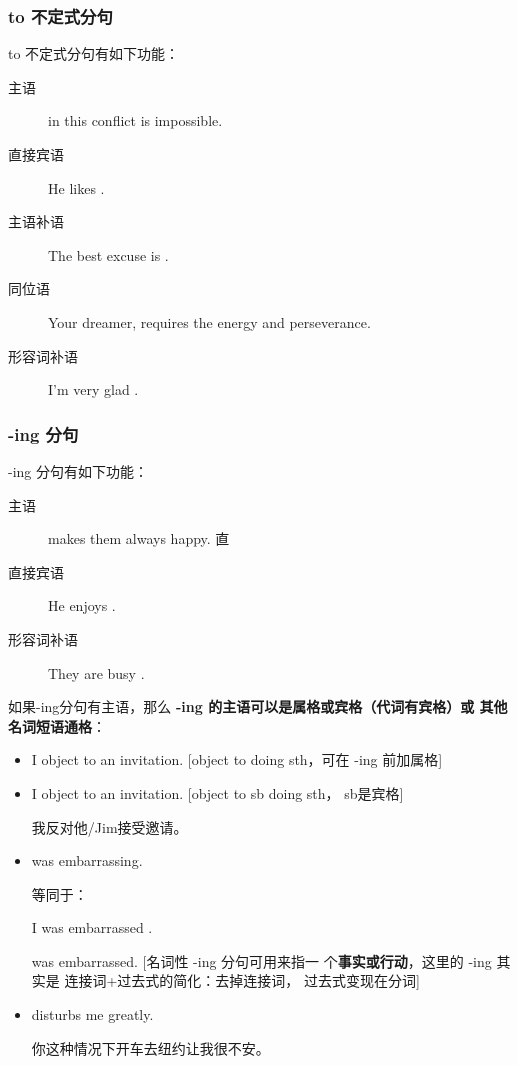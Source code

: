\subsubsection{to 不定式分句}

to 不定式分句有如下功能：
\begin{description}
\item[主语]  in this conflict is impossible.
\item[直接宾语] He likes .
\item[主语补语] The best excuse is .

\item[同位语] Your dreamer,  requires the
  energy and perseverance.

\item[形容词补语] I'm very glad .
\end{description}

\subsubsection{-ing 分句}

-ing 分句有如下功能：
\begin{description}
\item[主语]  makes them always happy.
  直
\item[直接宾语] He enjoys .

\item[形容词补语] They are busy .
\end{description}

如果-ing分句有主语，那么 \textbf{-ing 的主语可以是属格或宾格（代词有宾格）或
其他名词短语通格}：
\begin{itemize}
\item I object to  an invitation. [object to doing
  sth，可在 -ing 前加属格]
\item I object to  an invitation. [object to sb
  doing sth， sb是宾格]

  我反对他/Jim接受邀请。

\item {} was embarrassing.


  等同于：

  I was embarrassed .

   was embarrassed. [名词性 -ing 分句可用来指一
  个\textbf{事实或行动}，这里的 -ing 其实是 连接词+过去式的简化：去掉连接词，
  过去式变现在分词]

\item {} disturbs me greatly.

  你这种情况下开车去纽约让我很不安。

\end{itemize}

